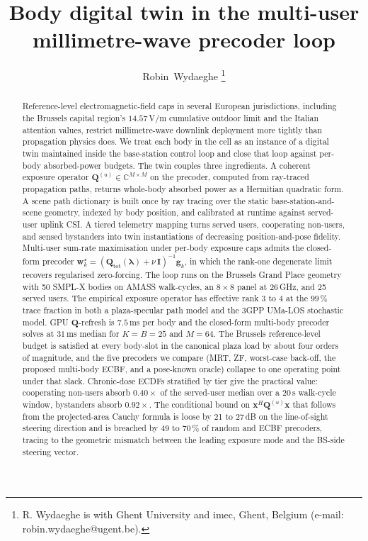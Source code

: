 \documentclass[journal,twocolumn,10pt]{IEEEtran}
\title{Body digital twin in the multi-user
millimetre-wave precoder loop}
\author{Robin~Wydaeghe%
  \thanks{R. Wydaeghe is with Ghent University and imec, Ghent, Belgium
  (e-mail: robin.wydaeghe@ugent.be).}}
\theoremstyle{plain}
\theoremstyle{remark}
\newcommand{\xx}{\mathbf{x}}
\newcommand{\ww}{\mathbf{w}}
\newcommand{\gvec}{\mathbf{g}}
\newcommand{\Qmat}{\mathbf{Q}}
\newcommand{\Complex}{\mathbb{C}}
\begin{document}
\maketitle

\begin{abstract}
Reference-level electromagnetic-field caps in several European
jurisdictions, including the Brussels capital region's $14.57\,$V/m
cumulative outdoor limit and the Italian attention values, restrict
millimetre-wave downlink deployment more tightly than propagation
physics does. We treat each body in the cell as an instance of a
digital twin maintained inside the base-station control loop and
close that loop against per-body absorbed-power budgets. The twin
couples three ingredients. A coherent exposure operator
$\Qmat^{(u)} \in \Complex^{M \times M}$ on the precoder, computed
from ray-traced propagation paths, returns whole-body absorbed power
as a Hermitian quadratic form. A scene path dictionary is built once
by ray tracing over the static base-station-and-scene geometry,
indexed by body position, and calibrated at runtime against served-user
uplink CSI. A tiered telemetry mapping turns served users, cooperating
non-users, and sensed bystanders into twin instantiations of
decreasing position-and-pose fidelity. Multi-user sum-rate maximisation
under per-body exposure caps admits the closed-form precoder
$\ww_k^\star = (\Qmat_{\mathrm{tot}}(\bm\lambda) + \nu\,\mathbf{I})^{-1}
\gvec_k$, in which the rank-one degenerate limit recovers regularised
zero-forcing. The loop runs on the Brussels Grand Place geometry with
50 SMPL-X bodies on AMASS walk-cycles, an $8 \times 8$ panel at
$26\,$GHz, and 25 served users. The empirical exposure operator has
effective rank 3 to 4 at the $99\,\%$ trace fraction in both a
plaza-specular path model and the 3GPP UMa-LOS stochastic model.
GPU $\Qmat$-refresh is $7.5\,$ms per body and the closed-form
multi-body precoder solves at $31\,$ms median for $K = B = 25$ and
$M = 64$. The Brussels reference-level budget is satisfied at every
body-slot in the canonical plaza load by about four orders of
magnitude, and the five precoders we compare (MRT, ZF, worst-case
back-off, the proposed multi-body ECBF, and a pose-known oracle)
collapse to one operating point under that slack. Chronic-dose
ECDFs stratified by tier give the practical value: cooperating
non-users absorb $0.40\times$ of the served-user median over a
$20\,$s walk-cycle window, bystanders absorb $0.92\times$. The
conditional bound on $\xx^H \Qmat^{(u)} \xx$ that follows from the
projected-area Cauchy formula is loose by 21 to $27\,$dB on the
line-of-sight steering direction and is breached by 49 to $70\,\%$
of random and ECBF precoders, tracing to the geometric mismatch
between the leading exposure mode and the BS-side steering vector.
\end{abstract}
\end{document}
